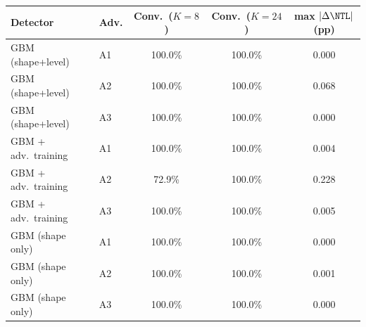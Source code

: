 \begin{tabular}{llccc}
\toprule
Detector & Adv. & Conv.\ ($K{=}8$) & Conv.\ ($K{=}24$) & max $|\Delta\NTL|$ (pp) \\
\midrule
GBM (shape+level) & A1 & 100.0\% & 100.0\% & 0.000 \\
GBM (shape+level) & A2 & 100.0\% & 100.0\% & 0.068 \\
GBM (shape+level) & A3 & 100.0\% & 100.0\% & 0.000 \\
GBM + adv.\ training & A1 & 100.0\% & 100.0\% & 0.004 \\
GBM + adv.\ training & A2 & 72.9\% & 100.0\% & 0.228 \\
GBM + adv.\ training & A3 & 100.0\% & 100.0\% & 0.005 \\
GBM (shape only) & A1 & 100.0\% & 100.0\% & 0.000 \\
GBM (shape only) & A2 & 100.0\% & 100.0\% & 0.001 \\
GBM (shape only) & A3 & 100.0\% & 100.0\% & 0.000 \\
\bottomrule
\end{tabular}
